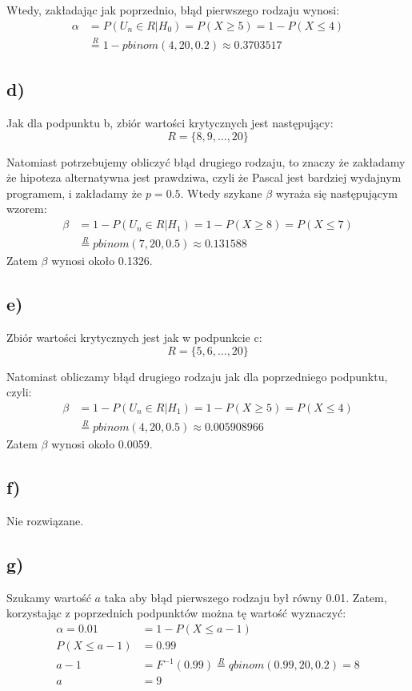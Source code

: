 \documentclass{article}
\begin{document}
Wtedy, zakładając jak poprzednio, błąd pierwszego rodzaju wynosi:
\begin{align*} \alpha & = P(U_n \in R|H_0) = P(X \geq 5) = 1 - P(X \leq 4) \\
& \overset{R}{=} 1 - pbinom(4, 20, 0.2) \approx 0.3703517 \end{align*}

\subsection{d)}
Jak dla podpunktu b, zbiór wartości krytycznych jest następujący:
\[ R = \{ 8,9,\dots,20 \} \]

Natomiast potrzebujemy obliczyć błąd drugiego rodzaju, to znaczy że zakładamy że hipoteza alternatywna jest prawdziwa, czyli że Pascal jest bardziej wydajnym programem, i zakładamy że $p = 0.5$. Wtedy szykane $\beta$ wyraża się następującym wzorem:
\begin{align*}
\beta & = 1 - P(U_n \in R |H_1) = 1 - P(X \geq 8) = P(X \leq 7) \\
& \overset{R}{=} pbinom(7, 20, 0.5) \approx 0.131588
\end{align*}
Zatem $\beta$ wynosi około 0.1326.

\subsection{e)}
Zbiór wartości krytycznych jest jak w podpunkcie c:
\[ R = \{ 5, 6, \dots, 20 \} \]

Natomiast obliczamy błąd  drugiego rodzaju jak dla poprzedniego podpunktu, czyli:
\begin{align*}
\beta & = 1 - P(U_n \in R |H_1) = 1 - P(X \geq 5) = P(X \leq 4) \\
& \overset{R}{=} pbinom(4, 20, 0.5) \approx 0.005908966
\end{align*}
Zatem $\beta$ wynosi około 0.0059.

\subsection{f)}
Nie rozwiązane.

\subsection{g)}
Szukamy wartość $a$ taka aby błąd pierwszego rodzaju był równy 0.01. Zatem, korzystając z poprzednich podpunktów można tę wartość wyznaczyć:
\begin{align*}
\alpha = 0.01 &= 1 - P(X \leq a-1) \\
P(X \leq a-1) & = 0.99 \\
a-1 & = F^{-1}(0.99) \overset{R}{=} qbinom(0.99, 20, 0.2) = 8 \\
a & = 9
\end{align*}
\end{document}
